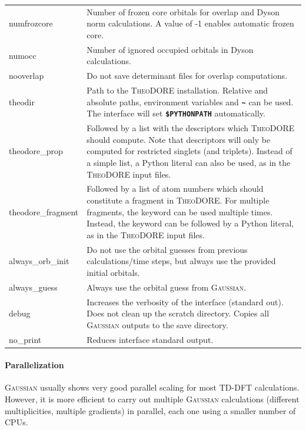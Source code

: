 \documentclass[a4paper,10pt,DIV=15,openany]{scrbook}
\newcommand{\ttt}[1]{\textbf{\texttt{#1}}}
\begin{document}
\begin{table}
\begin{tabular}{>{\ttfamily}lp{12cm}}
\\
numfrozcore             &Number of frozen core orbitals for overlap and Dyson norm calculations. A value of -1 enables automatic frozen core.
\\
numocc                  &Number of ignored occupied orbitals in Dyson calculations.
\\
nooverlap               &Do not save determinant files for overlap computations.
\\
theodir                 &Path to the \textsc{TheoDORE} installation. Relative and absolute paths, environment variables and \ttt{\textasciitilde} can be used. The interface will set \ttt{\$PYTHONPATH} automatically.
\\
theodore\_prop          &Followed by a list with the descriptors which \textsc{TheoDORE} should compute. Note that descriptors will only be computed for restricted singlets (and triplets). Instead of a simple list, a Python literal can also be used, as in the \textsc{TheoDORE} input files.
\\
theodore\_fragment      &Followed by a list of atom numbers which should constitute a fragment in \textsc{TheoDORE}. For multiple fragments, the keyword can be used multiple times. Instead, the keyword can be followed by a Python literal, as in the \textsc{TheoDORE} input files.
\\
always\_orb\_init       &Do not use the orbital guesses from previous calculations/time steps, but always use the provided initial orbitals.
\\
always\_guess           &Always use the orbital guess from \textsc{Gaussian}.
\\
  debug                 &Increases the verbosity of the interface (standard out). Does not clean up the scratch directory. Copies all \textsc{Gaussian} outputs to the save directory.
\\
  no\_print             &Reduces interface standard output.
\\
  \hline
  \end{tabular}
\end{table}

\paragraph{Parallelization}

\textsc{Gaussian} usually shows very good parallel scaling for most TD-DFT calculations.
However, it is more efficient to carry out multiple \textsc{Gaussian} calculations (different multiplicities, multiple gradients) in parallel, each one using a smaller number of CPUs.
\end{document}
